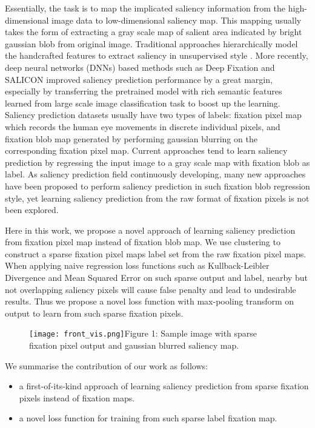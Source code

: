 \documentclass[letterpaper, 10 pt, conference]{ieeeconf}  %
\begin{document}
\par Essentially, the task is to map the implicated saliency information from the high-dimensional image data to low-dimensional saliency map. This mapping usually takes the form of extracting a gray scale map of salient area indicated by bright gaussian blob from original image. Traditional approaches hierarchically model the handcrafted features to extract saliency in unsupervised style \cite{b5}. More recently, deep neural networks (DNNs) based methods such as Deep Fixation \cite{b6} and SALICON \cite{b7} improved saliency prediction performance by a great margin, especially by transferring the pretrained model with rich semantic features learned from large scale image classification task to boost up the learning. Saliency prediction datasets usually have two types of labels: fixation pixel map which records the human eye movements in discrete individual pixels, and fixation blob map generated by performing gaussian blurring on the corresponding fixation pixel map. Current approaches tend to learn saliency prediction by regressing the input image to a gray scale map with fixation blob as label. As saliency prediction field continuously developing, many new approaches have been proposed to perform saliency prediction in such fixation blob regression style, yet learning saliency prediction from the raw format of fixation pixels is not been explored.


\par Here in this work, we propose a novel approach of learning saliency prediction from fixation pixel map instead of fixation blob map. We use clustering to construct a sparse fixation pixel maps label set from the raw fixation pixel maps.  When applying naive regression loss functions such as Kullback-Leibler Divergence and Mean Squared Error on such sparse output and label, nearby but not overlapping saliency pixels will cause false penalty and lead to undesirable results. Thus we propose a novel loss function with max-pooling transform on output to learn from such sparse fixation pixels.

\begin{figure}[!t]
\centering
    \texttt{[image: front\_vis.png]}{Figure 1: Sample image with sparse fixation pixel output and gaussian blurred saliency map.\label{fig1}}
\end{figure}

\par We summarise the contribution of our work as follows:

\begin{itemize}
\item a first-of-its-kind approach of learning saliency prediction from sparse fixation pixels instead of fixation maps.

\item a novel loss function for training from such sparse label fixation map.
\end{itemize}
\end{document}
